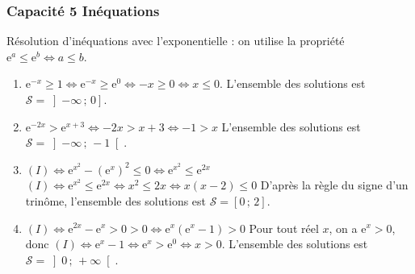 \documentclass[11pt, hyperref={urlcolor=red,%
            linkcolor=blue, %
            colorlinks=true}]{beamer}
\newcommand{\Interoo}[2]{\left]#1\, ;\, #2\right[}
\newcommand{\Interof}[2]{\left]#1\, ;\, #2\right]}
\newcommand{\Interff}[2]{\left[#1\, ;\, #2\right]}
\begin{document}
\begin{frame}
\frametitle{Capacité 5 Inéquations}
\label{capacite5}

Résolution d'inéquations avec l'exponentielle : on utilise la propriété $\text{e}^{a} \leqslant \text{e}^{b} \Leftrightarrow a \leqslant b$.

\begin{enumerate}

\item $\text{e}^{-x} \geqslant 1 \Leftrightarrow \text{e}^{-x} \geqslant \text{e}^{0}  \Leftrightarrow -x \geqslant 0   \Leftrightarrow x \leqslant 0 $.
L'ensemble des solutions est $\boxed{\mathcal{S} = \Interof{-\infty}{0}}$.
		\item $\text{e}^{-2x} > \text{e}^{x+3} \Leftrightarrow -2x > x + 3 \Leftrightarrow -1>x$
L'ensemble des solutions est $\boxed{\mathcal{S} = \Interoo{-\infty}{-1}}$.
		\item  $(I) \Leftrightarrow\text{e}^{x^2} -\left(\text{e}^{x}\right)^{2} \leqslant 0 \Leftrightarrow \text{e}^{x^2} \leqslant \text{e}^{2x}$
		 $(I) \Leftrightarrow \text{e}^{x^2} \leqslant \text{e}^{2x} \Leftrightarrow x^2 \leqslant 2x \Leftrightarrow x(x-2) \leqslant 0$
D'après la règle du signe d'un trinôme, l'ensemble des solutions est 	$\boxed{\mathcal{S} = \Interff{0}{2}}$. 
		\item $(I) \Leftrightarrow \text{e}^{2x} -\text{e}^{x} > 0 > 0 \Leftrightarrow  \text{e}^{x} \left(\text{e}^{x} - 1 \right)>0$
Pour tout réel $x$, on a $\text{e}^{x}>0$, donc $(I)\Leftrightarrow  \text{e}^{x} - 1 	\Leftrightarrow \text{e}^{x} > \text{e}^{0} \Leftrightarrow  x > 0$.  L'ensemble des solutions est $\boxed{\mathcal{S} = \Interoo{0}{+\infty}}$.
		\end{enumerate}
\end{frame}
\end{document}
